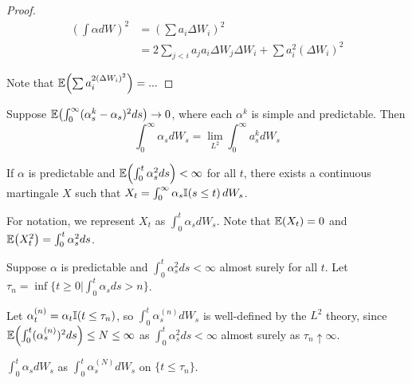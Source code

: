 \begin{proof}
  \begin{align}
    \label{eq:34}
    \left( \int \alpha dW \right)^{2} &= \left(\sum a_{i} \Delta
      W_{i}\right)^{2} \\
    &= 2 \sum_{j < i} a_{j} a_{i} \Delta W_{j} \Delta W_{i} + \sum
    a_{i}^{2} (\Delta W_{i})^{2}
  \end{align}

  Note that $\E{\sum a_{i}^{2 (\Delta W_{i})^{2}}} = ...$

\end{proof}

\begin{defn}
  \label{defn:continuous_time:5}
  Suppose $\E{\int_{0}^{\infty} (\alpha^{k}_{s} - \alpha_{s})^{2} ds}
  \rightarrow 0$, where each $\alpha^{k}$ is simple and predictable.
  Then
  \begin{equation}
    \label{eq:35}
    \int_{0}^{\infty} \alpha_{s} dW_{s} = \lim_{L^{2}}
    \int_{0}^{\infty} a_{s}^{k} dW_{s}
  \end{equation}
\end{defn}

\begin{thm}
  \label{defn:continuous_time:6}
  If $\alpha$ is predictable and $\E{\int_{0}^{t} \alpha_{s}^{2} ds} <
  \infty$ for all $t$, there exists a continuous martingale $X$ such
  that $X_{t} = \int_{0}^{\infty} \alpha_{s} \I{s \leq t} dW_{s}$.

\end{thm}

For notation, we represent $X_{t}$ as $\int_{0}^{t} \alpha_{s}
dW_{s}$.  Note that $\E{X_{t}} = 0$ and $\E{X_{t}^{2}} = \int_{0}^{t}
\alpha_{s}^{2} ds$.

\begin{defn}[Localization]
  \label{defn:continuous_time:7}
  Suppose $\alpha$ is predictable and $\int_{0}^{t} \alpha_{s}^{2} ds
  < \infty$ almost surely for all $t$.  Let $\tau_{n} = \inf \{ t \geq
  0 | \int_{0}^{t} \alpha_{s} ds > n \}$.

  Let $\alpha^{(n)}_{t} = \alpha_{t} \I{t \leq \tau_{n}}$, so
  $\int_{0}^{t} \alpha_{s}^{(n)} dW_{s}$ is well-defined by the
  $L^{2}$ theory, since $\E{\int_{0}^{t} (\alpha_{s}^{(n)})^{2} ds}
  \leq N \leq \infty$ as $\int_{0}^{t} \alpha_{s}^{2} ds < \infty$
  almost surely as $\tau_{n} \uparrow \infty$.
\end{defn}

\begin{notation}
  $\int_{0}^{t} \alpha_{s} dW_{s}$ as $\int_{0}^{t} \alpha_{s}^{(N)}
  dW_{s}$ on $\{ t \leq \tau_{n} \}$.
\end{notation}

